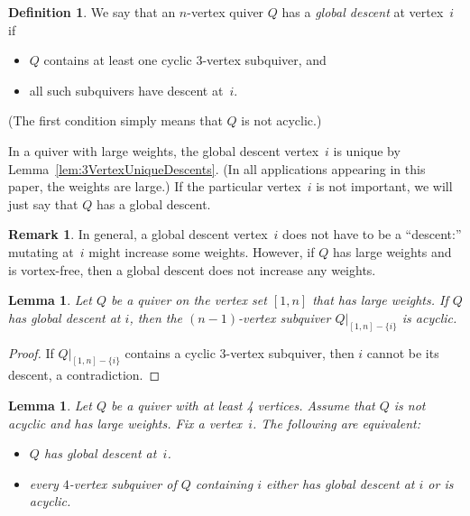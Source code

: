 \documentclass[11pt, letterpaper]{amsart}
\newtheorem{lemma}[theorem]{Lemma}
\theoremstyle{definition}
\newtheorem{remark}[theorem]{Remark}
\newtheorem{definition}[theorem]{Definition}
\numberwithin{equation}{section}
\begin{document}
\vspace{-.25in}

\begin{definition}
\label{def:globalDescent}
We say that an $n$-vertex quiver $Q$ has a \emph{global descent} 
at vertex~$i$ if
\begin{itemize}[leftmargin=.2in]
\item $Q$ contains at least one cyclic $3$-vertex subquiver, 
and 
\item
all such subquivers have descent at~$i$. 
\end{itemize}
(The first condition simply means that $Q$ is not acyclic.) 
\end{definition}

In a quiver with large weights, the global descent vertex~$i$ is unique by Lemma~\ref{lem:3VertexUniqueDescents}. 
(In all applications appearing in this paper, the weights are large.) 
If the particular vertex~$i$ is not important, we will just say that $Q$ has a global descent.

\begin{remark}
In general, a global descent vertex~$i$ does not have to be a ``descent:'' 
mutating at~$i$ might increase some weights.
However, if $Q$ has large weights and is vortex-free, 
then a global descent  does not increase any weights. 
\end{remark}

\begin{lemma}
\label{lem:Q-i-is-acyclic}
Let $Q$ be a quiver on the vertex set $[1,n]$ that has large weights. 
If $Q$ has global descent at $i$, then the $(n-1)$-vertex subquiver $Q|_{[1,n]-\{i\}}$ is acyclic. 
\end{lemma}

\begin{proof}
If $Q|_{[1,n]-\{i\}}$ contains a cyclic 3-vertex subquiver, then $i$ cannot be its descent, a contradiction. 
\end{proof}

\pagebreak[3]

\begin{lemma}
\label{lem:4VertexGlobalDescentTest}
Let $Q$ be a quiver with at least 4 vertices. 
Assume that $Q$ is not acyclic and has large weights. Fix a vertex~$i$. 
The following are equivalent: 
\begin{itemize}[leftmargin=.2in]
\item $Q$ has global descent at~$i$.
\item every $4$-vertex subquiver of $Q$ containing $i$ either has global descent at $i$ or is acyclic. 
\end{itemize}
\end{lemma}
\end{document}
